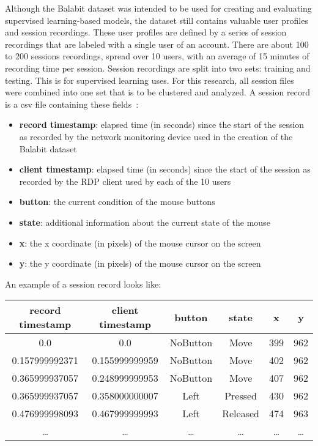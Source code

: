 Although the Balabit dataset was intended to be used for creating and evaluating supervised learning-based models, the dataset still contains valuable user profiles and session recordings.
These user profiles are defined by a series of session recordings that are labeled with a single user of an account.
There are about 100 to 200 sessions recordings, spread over 10 users, with an average of 15 minutes of recording time per session.
Session recordings are split into two sets: training and testing.
This is for supervised learning uses.
For this research, all session files were combined into one set that is to be clustered and analyzed.
A session record is a csv file containing these fields~\cite{balabit_dataset}:
\begin{itemize}
    \item \textbf{record timestamp}: elapsed time (in seconds) since the start of the session as recorded by the network monitoring device used in the creation of the Balabit dataset
    \item \textbf{client timestamp}: elapsed time (in seconds) since the start of the session as recorded by the RDP client used by each of the 10 users
    \item \textbf{button}: the current condition of the mouse buttons
    \item \textbf{state}: additional information about the current state of the mouse
    \item \textbf{x}: the x coordinate (in pixels) of the mouse cursor on the screen
    \item \textbf{y}: the y coordinate (in pixels) of the mouse cursor on the screen
\end{itemize}
An example of a session record looks like:
\begin{center}
    \begin{tabular}{ |c|c|c|c|c|c| }
        \hline
        \textbf{record timestamp} & \textbf{client timestamp} & \textbf{button} & \textbf{state} & \textbf{x} & \textbf{y} \\
        \hline
        0.0 & 0.0 & NoButton & Move & 399 & 962 \\
        0.157999992371 & 0.155999999959 & NoButton & Move & 402 & 962 \\
        0.365999937057 & 0.248999999953 & NoButton & Move & 407 & 962 \\
        0.365999937057 & 0.358000000007 & Left & Pressed & 430 & 962 \\
        0.476999998093 & 0.467999999993 & Left & Released & 474 & 963 \\
        \ldots & \ldots & \ldots & \ldots & \ldots & \ldots \\
        \hline
    \end{tabular}
\end{center}

